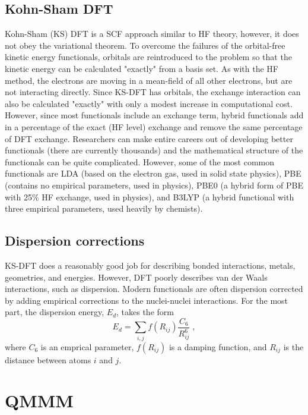 \documentclass[12pt]{report}
\begin{document}
\subsection{Kohn-Sham DFT}

Kohn-Sham (KS) DFT is a SCF approach similar to HF theory, however, it does
not obey the variational theorem. To overcome the failures of the orbital-free
kinetic energy functionals, orbitals are reintroduced to the problem so that
the kinetic energy can be calculated "exactly" from a basis set. As with the
HF method, the electrons are moving in a mean-field of all other electrons,
but are not interacting directly. Since KS-DFT has orbitals, the exchange
interaction can also be calculated "exactly" with only a modest increase in
computational cost. However, since most functionals include an exchange term,
hybrid functionals add in a percentage of the exact (HF level) exchange and
remove the same percentage of DFT exchange. Researchers can make entire
careers out of developing better functionals (there are currently thousands)
and the mathematical structure of the functionals can be quite complicated.
However, some of the most common functionals are LDA (based on the electron
gas, used in solid state physics), PBE (contains no empirical parameters, used
in physics), PBE0 (a hybrid form of PBE with 25\% HF exchange, used in
physics), and B3LYP (a hybrid functional with three empirical parameters, used
heavily by chemists).

\subsection{Dispersion corrections}

KS-DFT does a reasonably good job for describing bonded interactions, metals,
geometries, and energies. However, DFT poorly describes van der Waals
interactions, such as dispersion. Modern functionals are often dispersion
corrected by adding empirical corrections to the nuclei-nuclei interactions.
For the most part, the dispersion energy, $E_d$, takes the form
\begin{equation}
 E_d = \sum_{i,j} f(R_{ij})\frac{C_6}{R_{ij}^6} \; ,
\end{equation}
where $C_6$ is an emprical parameter, $f(R_{ij})$ is a damping function, and
$R_{ij}$ is the distance between atoms $i$ and $j$.

\FloatBarrier

\section{QMMM}
\end{document}
